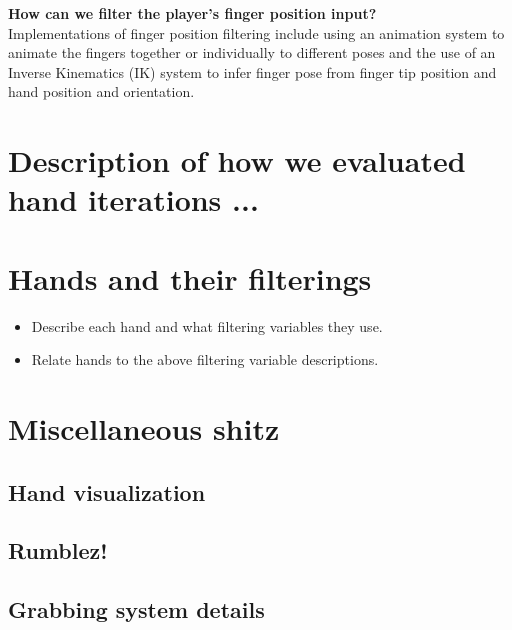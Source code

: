 \textbf{How can we filter the player's finger position input?}\\
Implementations of finger position filtering include using an animation system to animate the fingers together or individually to different poses and the use of an Inverse Kinematics (IK) system to infer finger pose from finger tip position and hand position and orientation.


\section{Description of how we evaluated hand iterations ...}
\label{sec:DESCRIPTIONOFEVALUATIONSCENARIOS}

\section{Hands and their filterings}
\label{sec:LABELABOUTHANDSVERSIONS}
\begin{itemize}
\item Describe each hand and what filtering variables they use.
\item Relate hands to the above filtering variable descriptions.
\end{itemize}

\section{Miscellaneous shitz}
\label{sec:MISCELLANEOUSSHITZ}

\subsection{Hand visualization}
\label{subsec:handVisualization}

\subsection{Rumblez!}
\label{subsec:RUMLBEZ}

\subsection{Grabbing system details}
\label{subsec:grabbingSystem}
